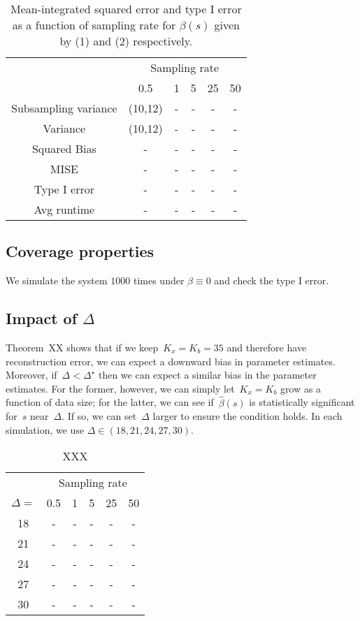 \documentclass[11pt]{amsart}
\begin{document}
\begin{table}[!th]
\begin{tabular}{c | c c c c c}
& \multicolumn{5}{c}{Sampling rate} \\ \cline{2-6}
 & 0.5 & 1 & 5 & 25 & 50 \\ \hline
Subsampling variance & (10,12) & - & - & - & - \\
Variance & (10,12) & - & - & - & - \\
Squared Bias & - & - & - & - & -  \\
MISE & - & - & - & - & -  \\ \hline
Type I error & - & - & - & - & -  \\ \hline
Avg runtime & - & - & - & - & - \\
\end{tabular}
\caption{Mean-integrated squared error and type I error as a function of sampling rate for $\beta(s)$ given by (1) and (2) respectively.}
\label{tab:mise}
\end{table}

\subsection{Coverage properties}

We simulate the system $1000$ times under $\beta \equiv 0$ and check the type I error.

\subsection{Impact of $\Delta$}

Theorem~XX shows that if we keep~$K_x = K_b = 35$ and therefore have reconstruction error, we can expect a downward bias in parameter estimates. Moreover, if~$\Delta < \Delta^\star$ then we can expect a similar bias in the parameter estimates.  For the former, however, we can simply let~$K_x = K_b$ grow as a function of data size; for the latter, we can see if~$\hat \beta(s)$ is statistically significant for~$s$ near~$\Delta$. If so, we can set~$\Delta$ larger to ensure the condition holds.  In each simulation, we use $\Delta \in (18,21,24,27,30)$.

\begin{table}[!th]
\begin{tabular}{c c c c c c}
& \multicolumn{5}{c}{Sampling rate} \\ \cline{2-6}
$\Delta=$ & 0.5 & 1 & 5 & 25 & 50 \\ \hline
18  & - & - & - & - & -  \\
21 & - & - & - & - & -  \\
24 & - & - & - & - & -  \\
27 & - & - & - & - & -  \\
30 & - & - & - & - & -  \\ \hline
\end{tabular}
\caption{XXX}
\label{tab:mise}
\end{table}
\end{document}
